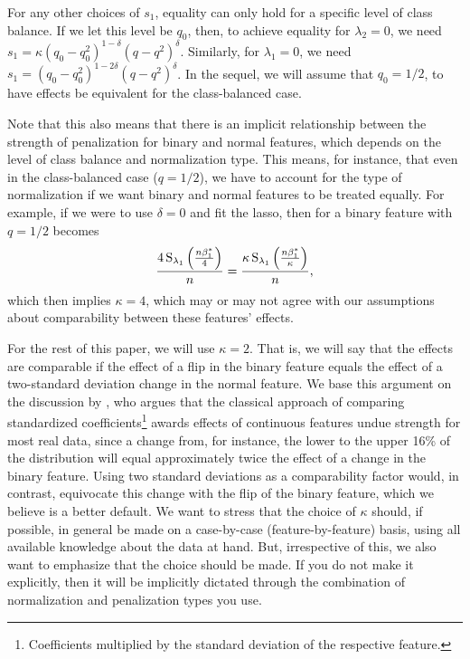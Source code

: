 For any other choices of \(s_1\), equality can only hold for a specific level of class
balance. If we let this level be \(q_0\), then, to achieve equality for \(\lambda_2 = 0\),
we need \(s_1 =\kappa (q_0 - q_0^2)^{1 - \delta}(q - q^2)^\delta\). Similarly, for
\(\lambda_1 = 0\), we need \(s_1 = (q_0 - q_0^2)^{1 - 2\delta} (q - q^2)^\delta\). In the
sequel, we will assume that \(q_0 = 1/2\), to have effects be equivalent for the
class-balanced case.

Note that this also means that there is an implicit relationship between the strength of
penalization for binary and normal features, which depends on the level of class balance
and normalization type. This means, for instance, that even in the class-balanced case (\(q
= 1/2\)), we have to account for the type of normalization if we want binary and normal
features to be treated equally. For example, if we were to use \(\delta=0\) and fit the
lasso, then  for a binary feature with \(q=1/2\) becomes
\[
  \frac{4\operatorname{S}_{\lambda_1}\left(\frac{n\beta_1^*}{4}\right)}{n}               = \frac{\kappa \operatorname{S}_{\lambda_1}\left(\frac{n\beta_1^*}{\kappa} \right)}{n},
\]
which then implies \(\kappa = 4\), which may or may not agree with our assumptions about
comparability between these features' effects.

For the rest of this paper, we will use \(\kappa = 2\). That is, we will say that the
effects are comparable if the effect of a flip in the binary feature equals the effect of a
two-standard deviation change in the normal feature. We base this argument on the
discussion by \citet{gelman2008}, who argues that the classical approach of comparing
standardized coefficients\footnote{Coefficients multiplied by the standard deviation of the
  respective feature.} awards effects of continuous features undue strength for most real
data, since a change from, for instance, the lower to the upper 16\% of the distribution
will equal approximately twice the effect of a change in the binary feature. Using two
standard deviations as a comparability factor would, in contrast, equivocate this change
with the flip of the binary feature, which we believe is a better default. We want to
stress that the choice of \(\kappa\) should, if possible, in general be made on a
case-by-case (feature-by-feature) basis, using all available knowledge about the data at
hand. But, irrespective of this, we also want to emphasize that the choice should be made.
If you do not make it explicitly, then it will be implicitly dictated through the
combination of normalization and penalization types you use.

